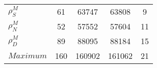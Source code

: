 \begin{center}
\begin{longtable}{lcccc}
$ {\rho^{M}_{S}}       $	 & 	                   61	 & 	                63747	 & 	                63808	 & 	                    9 \\ 
$ {\rho^{M}_{N}}       $	 & 	                   52	 & 	                57552	 & 	                57604	 & 	                   11 \\ 
$ {\rho^{M}_{D}}       $	 & 	                   89	 & 	                88095	 & 	                88184	 & 	                   15 \\ 
$Maximum               $	 & 	                  160	 & 	               160902	 & 	               161062	 & 	                   21 \\ 
\end{longtable}
 \end{center}
